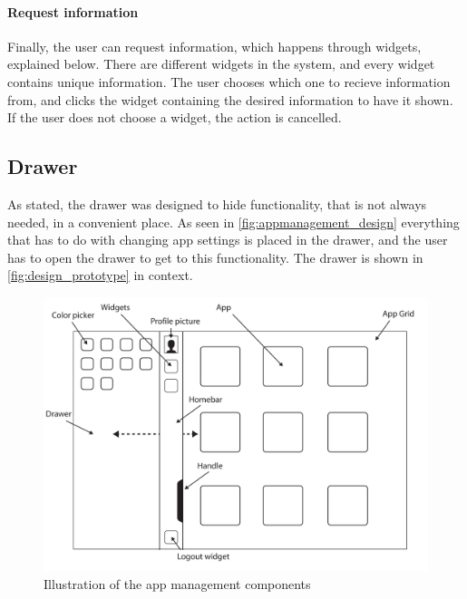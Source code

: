 \paragraph{Request information} Finally, the user can request information, which happens through widgets, explained below. 
There are different widgets in the system, and every widget contains unique information.
The user chooses which one to recieve information from, and clicks the widget containing the desired information to have it shown. 
If the user does not choose a widget, the action is cancelled. 

\subsection{Drawer}
\label{sec:drawer}
As stated, the drawer was designed to hide functionality, that is not always needed, in a convenient place. 
As seen in \autoref{fig:appmanagement_design} everything that has to do with changing app settings is placed in the drawer, and the user has to open the drawer to get to this functionality.
The drawer is shown in \autoref{fig:design_prototype} in context.

\begin{figure}[!h]
	\centering
	\includegraphics[width=1\textwidth]{gfx/design_prototype.pdf}
	\caption{Illustration of the app management components}
	\label{fig:design_prototype}
\end{figure}

